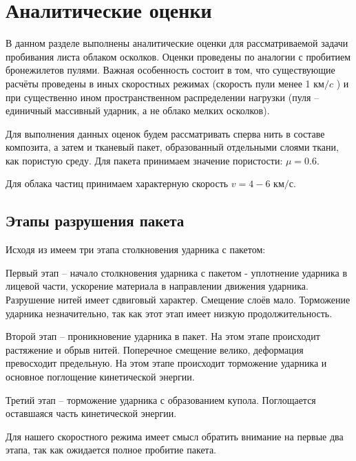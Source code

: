 
\section{Аналитические оценки}\label{ch:equations}

В данном разделе выполнены аналитические оценки для рассматриваемой задачи пробивания листа облаком осколков.
Оценки проведены по аналогии с пробитием бронежилетов пулями.
Важная особенность состоит в том, что существующие расчёты проведены в иных скоростных режимах (скорость пули менее
1 $км/c$ ) и при существенно ином пространственном распределении нагрузки (пуля -- единичный массивный ударник, а не облако мелких
осколков).

Для выполнения данных оценок будем рассматривать сперва нить в составе композита, а затем и тканевый пакет, 
образованный отдельными слоями ткани, как пористую среду. Для пакета принимаем значение пористости: $\mu=0.6$\cite{buzov2004}.

Для облака частиц принимаем характерную скорость $v=4-6$ $км/с$.

\subsection{Этапы разрушения пакета}\label{sec:destr-stages}
Исходя из\cite{kobylkin2014} имеем три этапа столкновения ударника с пакетом:

Первый этап -- начало столкновения ударника с пакетом - уплотнение ударника в лицевой части,
ускорение материала в направлении движения ударника.
Разрушение нитей имеет сдвиговый характер.
Смещение слоёв мало.
Торможение ударника незначительно, так как этот этап имеет низкую продолжительность.

Второй этап -- проникновение ударника в пакет.
На этом этапе происходит растяжение и обрыв нитей.
Поперечное смещение велико, деформация превосходит предельную.
На этом этапе происходит торможение ударника и основное поглощение кинетической энергии.

Третий этап -- торможение ударника с образованием купола.
Поглощается оставшаяся часть кинетической энергии.

Для нашего скоростного режима имеет смысл обратить внимание на первые два этапа, так как ожидается полное пробитие пакета.

